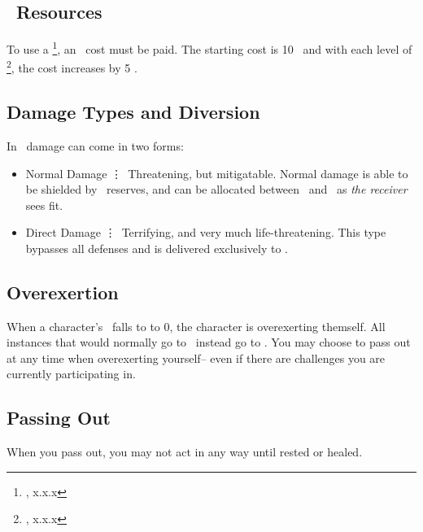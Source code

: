 \subsection{\techn\ Resources}\index{\techn}

To use a \techn\footnote{\techn, x.x.x}, an \ENful\ cost must
be paid. The starting cost is 10 \EN\ and with each level of \advancement\footnote{\advancement, x.x.x}\index{\advancement},
the cost increases by 5 \EN.

\subsection{Damage Types and Diversion}
In \gametitlemini\ damage can come in two forms:
\begin{itemize}
	\item Normal Damage \vdots\ Threatening, but mitigatable. Normal damage is able to be shielded by \ENful\ reserves, and can be allocated between \HPful\ and \ENful\ as \emph{the receiver} sees fit.
	\item Direct Damage \vdots\ Terrifying, and very much life-threatening. This type bypasses all defenses and is delivered exclusively to \HPful .
\end{itemize}

\subsection{Overexertion}

When a character's \ENful\ falls to to 0, the character is overexerting themself. All instances that would normally go to \ENful\ instead go to \HPful . You may choose to pass out at any time when overexerting yourself-- even if there are challenges you are currently participating in.

\subsection{Passing Out}
When you pass out, you may not act in any way until rested or healed.

